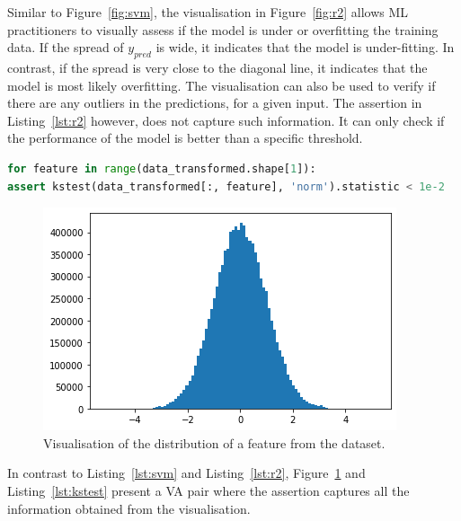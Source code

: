\documentclass[conference]{IEEEtran}
\begin{document}
Similar to Figure~\ref{fig:svm}, the visualisation in Figure~\ref{fig:r2} allows ML practitioners to visually assess if the model is under or overfitting the training data. If the spread of $y_{pred}$ is wide, it indicates that the model is under-fitting. In contrast, if the spread is very close to the diagonal line, it indicates that the model is most likely overfitting. The visualisation can also be used to verify if there are any outliers in the predictions, for a given input. The assertion in Listing~\ref{lst:r2} however, does not capture such information. It can only check if the performance of the model is better than a specific threshold.

\begin{lstlisting}[language=Python, caption={Assertion to check that each feature in a dataset is normal. The distribution of each feature is compared to that of a normal distribution using the Kolmogorov-Smirnov test for goodness of fit from the scipy library.}, label={lst:kstest}]
for feature in range(data_transformed.shape[1]):
assert kstest(data_transformed[:, feature], 'norm').statistic < 1e-2
\end{lstlisting}

\begin{figure}
  \includegraphics[width=\linewidth]{../catalogue/select-152a.png}
  \caption{Visualisation of the distribution of a feature from the dataset.}\label{fig:kstest}
\end{figure}

In contrast to Listing~\ref{lst:svm} and Listing~\ref{lst:r2}, Figure~\ref{fig:kstest} and Listing~\ref{lst:kstest} present a VA pair where the assertion captures all the information obtained from the visualisation.
\end{document}
